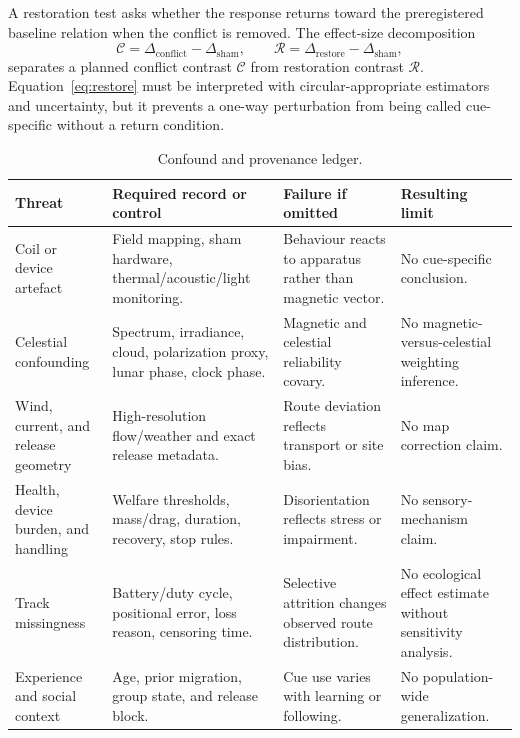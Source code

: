 \documentclass[conference]{IEEEtran}
\begin{document}
A restoration test asks whether the response returns toward the preregistered baseline relation when the conflict is removed. The effect-size decomposition
\begin{equation}
\mathcal{C}=\Delta_{\mathrm{conflict}}-\Delta_{\mathrm{sham}},\qquad \mathcal{R}=\Delta_{\mathrm{restore}}-\Delta_{\mathrm{sham}},
\label{eq:restore}
\end{equation}
separates a planned conflict contrast $\mathcal{C}$ from restoration contrast $\mathcal{R}$. Equation~\eqref{eq:restore} must be interpreted with circular-appropriate estimators and uncertainty, but it prevents a one-way perturbation from being called cue-specific without a return condition.

\begin{table}[!t]
\caption{Confound and provenance ledger.}\label{tab:confounds}\centering\footnotesize
\begin{tabular}{@{}L{.20\textwidth}L{.27\textwidth}L{.23\textwidth}L{.22\textwidth}@{}}\toprule
Threat & Required record or control & Failure if omitted & Resulting limit\\\midrule
Coil or device artefact & Field mapping, sham hardware, thermal/acoustic/light monitoring. & Behaviour reacts to apparatus rather than magnetic vector. & No cue-specific conclusion.\\
Celestial confounding & Spectrum, irradiance, cloud, polarization proxy, lunar phase, clock phase. & Magnetic and celestial reliability covary. & No magnetic-versus-celestial weighting inference.\\
Wind, current, and release geometry & High-resolution flow/weather and exact release metadata. & Route deviation reflects transport or site bias. & No map correction claim.\\
Health, device burden, and handling & Welfare thresholds, mass/drag, duration, recovery, stop rules. & Disorientation reflects stress or impairment. & No sensory-mechanism claim.\\
Track missingness & Battery/duty cycle, positional error, loss reason, censoring time. & Selective attrition changes observed route distribution. & No ecological effect estimate without sensitivity analysis.\\
Experience and social context & Age, prior migration, group state, and release block. & Cue use varies with learning or following. & No population-wide generalization.\\\bottomrule
\end{tabular}
\end{table}
\end{document}
